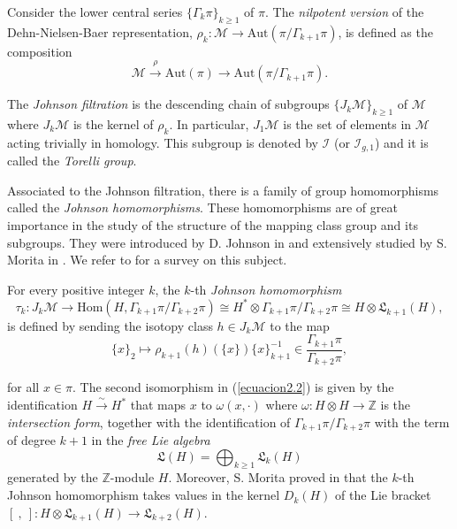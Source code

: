 \documentclass[10pt]{amsart}
\numberwithin{equation}{section}
\numberwithin{equation}{section}
\theoremstyle{definition}
\begin{document}
Consider the lower central series $\{\Gamma_k\pi\}_{k\geq1}$ of $\pi$. The \emph{nilpotent version}  of the Dehn-Nielsen-Baer representation,  $\rho_{k}:\mathcal{M}\rightarrow \text{Aut}(\pi/\Gamma_{k+1}\pi)$, is  defined as the composition
\begin{equation}\label{ecuacion2.1}%
\mathcal{M}\stackrel{\rho}{\longrightarrow}\text{Aut}(\pi)\longrightarrow \text{Aut}(\pi/\Gamma_{k+1}\pi).
\end{equation}

The \emph{Johnson filtration} is the descending chain of subgroups $\{J_k\mathcal{M}\}_{k\geq1}$ of $\mathcal{M}$   where $J_k\mathcal{M}$ is the kernel of $\rho_k$. In particular, $J_1\mathcal{M}$ is the set of elements in $\mathcal{M}$ acting trivially in homology. This subgroup is denoted by $\mathcal{I}$ (or $\mathcal{I}_{g,1}$) and it is called the \emph{Torelli group}.

Associated to the Johnson filtration, there is a family of group homomorphisms called the \emph{Johnson homomorphisms}. These homomorphisms are of great  importance in the study of the structure of the mapping class group and its subgroups. They were introduced by D. Johnson in \cite{MR579103,MR718141} and extensively studied by S. Morita in \cite{MR1133875,MR1224104}. We refer to \cite{MR3380338} for a survey on this subject.

For every positive integer $k$, the $k$-th \emph{Johnson homomorphism}
\begin{equation}\label{ecuacion2.2}%
\tau_k: J_k\mathcal{M}\longrightarrow \text{Hom}(H,\Gamma_{k+1}\pi/\Gamma_{k+2}\pi)\cong H^*\otimes \Gamma_{k+1}\pi/\Gamma_{k+2}\pi \cong H\otimes \mathfrak{L}_{k+1}(H),
\end{equation}
\noindent is defined by sending the isotopy class  $h\in J_k\mathcal{M}$ to the map
$$\{x\}_2\longmapsto \rho_{k+1}(h)(\{x\})\{x\}_{k+1}^{-1}\in\frac{\Gamma_{k+1}\pi}{\Gamma_{k+2}\pi},$$

\noindent for all $x\in\pi$. The second isomorphism in  (\ref{ecuacion2.2}) is given by  the identification $H\stackrel{\sim}{\longrightarrow} H^*$ that maps $x$ to $\omega(x, \cdot)$ where  $\omega:H\otimes H\rightarrow\mathbb{Z}$ is the \emph{intersection form},  together with the identification of $\Gamma_{k+1}\pi/\Gamma_{k+2}\pi$ with the term of degree $k+1$ in the \emph{free Lie algebra}  
$$\mathfrak{L}(H)=\bigoplus_{k\geq 1}\mathfrak{L}_{k}(H)$$
generated by the $\mathbb{Z}$-module $H$.
Moreover, S. Morita proved in \cite[Corollary 3.2]{MR1224104} that the $k$-th Johnson homomorphism takes values in the kernel $D_k(H)$ of the Lie bracket  $\left[\ ,\ \right]: H\otimes\mathfrak{L}_{k+1}(H)\rightarrow\mathfrak{L}_{k+2}(H)$.
\end{document}
